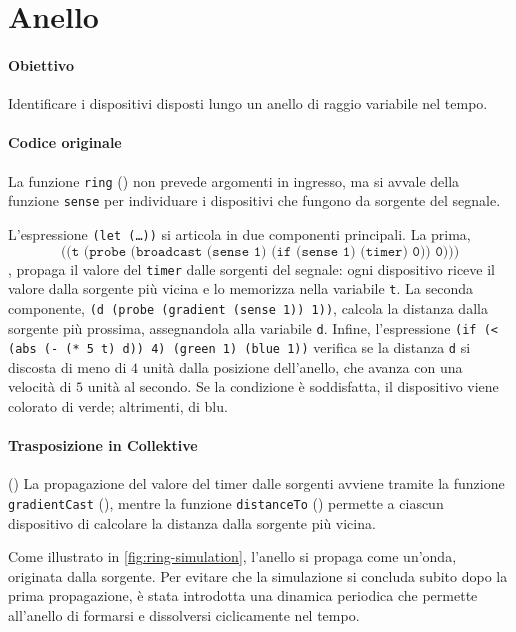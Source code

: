 \newpage
\section{Anello}
\label{sec:ring}

\paragraph{Obiettivo} Identificare i dispositivi disposti lungo un anello di raggio variabile nel tempo.

\paragraph{Codice originale} La funzione \texttt{ring} () non prevede argomenti in ingresso, ma si avvale della funzione \texttt{sense} per individuare i dispositivi che fungono da sorgente del segnale.
%

%
L'espressione \texttt{(let (\dots))} si articola in due componenti principali. La prima, \[
\texttt{((t (probe (broadcast (sense 1) (if (sense 1) (timer) 0)) 0)))}\], propaga il valore del \texttt{timer} dalle sorgenti del segnale: ogni dispositivo riceve il valore dalla sorgente più vicina e lo memorizza nella variabile \texttt{t}.
%
La seconda componente, \texttt{(d (probe (gradient (sense 1)) 1))}, calcola la distanza dalla sorgente più prossima, assegnandola alla variabile \texttt{d}.
%
Infine, l'espressione \texttt{(if (< (abs (- (* 5 t) d)) 4) (green 1) (blue 1))} verifica se la distanza \texttt{d} si discosta di meno di \(4\) unità dalla posizione dell'anello, che avanza con una velocità di \(5\) unità al secondo.
%
Se la condizione è soddisfatta, il dispositivo viene colorato di verde; altrimenti, di blu.

\paragraph{Trasposizione in Collektive} () 
La propagazione del valore del timer dalle sorgenti avviene tramite la funzione \texttt{gradientCast} (), mentre la funzione \texttt{distanceTo} () permette a ciascun dispositivo di calcolare la distanza dalla sorgente più vicina.

Come illustrato in \cref{fig:ring-simulation}, l’anello si propaga come un’onda, originata dalla sorgente. Per evitare che la simulazione si concluda subito dopo la prima propagazione, è stata introdotta una dinamica periodica che permette all’anello di formarsi e dissolversi ciclicamente nel tempo.

